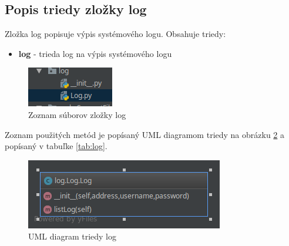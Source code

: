 \subsection{Popis triedy zložky log}
Zložka log popisuje výpis systémového logu. Obsahuje triedy:\begin{itemize}
\item \textbf{log} - trieda log na výpis systémového logu
\end{itemize}
\begin{figure}[H]
\centering
\includegraphics[scale=0.6]{../text/log.png}
\caption{Zoznam súborov zložky log}
\label{fig:log}
\end{figure}
Zoznam použitých metód je popísaný UML diagramom triedy na obrázku \ref{fig:logUML} a popísaný v tabuľke \ref{tab:log}.
\begin{table}[H]
\caption{Tabuľka metód triedy log}
\label{tab:log}
\end{table}
\begin{figure}[H]
\centering
\includegraphics[scale=0.6]{../text/logUML.png}
\caption{UML diagram triedy log}
\label{fig:logUML}
\end{figure}
